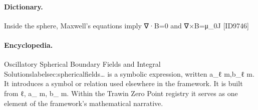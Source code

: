 \paragraph{Dictionary.}
Inside the sphere, Maxwell's equations imply ∇·B=0 and ∇×B=μ\_0J [ID9746]

\paragraph{Encyclopedia.}
Oscillatory Spherical Boundary Fields and Integral Solutionslabelsec:sphericalfields… is a symbolic expression, written a\_ℓ m,b\_ℓ m. It introduces a symbol or relation used elsewhere in the framework. It is built from ℓ, a\_ m, b\_ m. Within the Trawin Zero Point registry it serves as one element of the framework's mathematical narrative.
